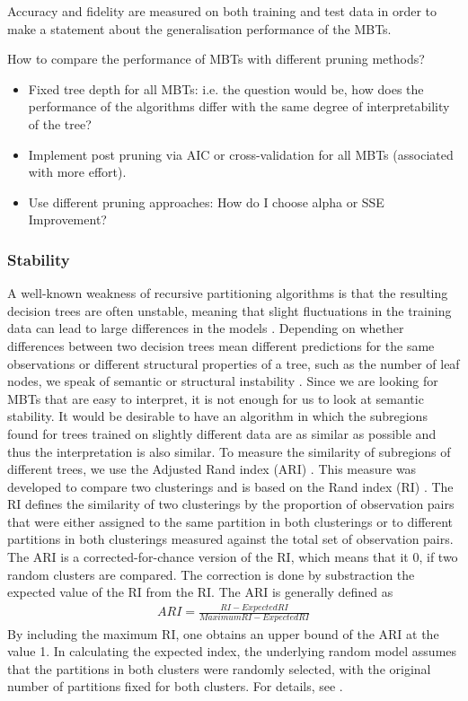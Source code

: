 Accuracy and fidelity are measured on both training and test data in order to make a statement about the generalisation performance of the MBTs.

\vspace{0.5cm}

\color{blue}
How to compare the performance of MBTs with different pruning methods?
\begin{itemize}
    \item Fixed tree depth for all MBTs: i.e. the question would be, how does the performance of the algorithms differ with the same degree of interpretability of the tree?
    \item Implement post pruning via AIC or cross-validation for all MBTs (associated with more effort).
    \item Use different pruning approaches: How do I choose alpha or SSE Improvement?
\end{itemize}
\color{black}

\subsubsection{Stability}
A well-known weakness of recursive partitioning algorithms is that the resulting decision trees are often unstable, meaning that slight fluctuations in the training data can lead to large differences in the models \citep{Fokkema.2020}.
Depending on whether differences between two decision trees mean different predictions for the same observations or different structural properties of a tree, such as the number of leaf nodes, we speak of semantic or structural instability \citep{Wang.2018}. 
Since we are looking for MBTs that are easy to interpret, it is not enough for us to look at semantic stability. It would be desirable to have an algorithm in which the subregions found for trees trained on slightly different data are as similar as possible and thus the interpretation is also similar.
To measure the similarity of subregions of different trees, we use the Adjusted Rand index (ARI) \citep{Hubert.1985}.
This measure was developed to compare two clusterings and is based on the Rand index (RI) \citep{Rand.1971}. The RI defines the similarity of two clusterings by the proportion of observation pairs that were either assigned to the same partition in both clusterings or to different partitions in both clusterings measured against the total set of observation pairs. The ARI is a corrected-for-chance version of the RI, which means that it $0$, if two random clusters are compared. The correction is done by substraction the expected value of the RI from the RI. The ARI is generally defined as
\begin{align}
    ARI = \frac{RI - Expected RI}{Maximum RI - Expected RI}
\end{align}
By including the maximum RI, one obtains an upper bound of the ARI at the value 1.
In calculating the expected index, the underlying random model assumes that the partitions in both clusters were randomly selected, with the original number of partitions fixed for both clusters. 
For details, see \citep{Hubert.1985}.





